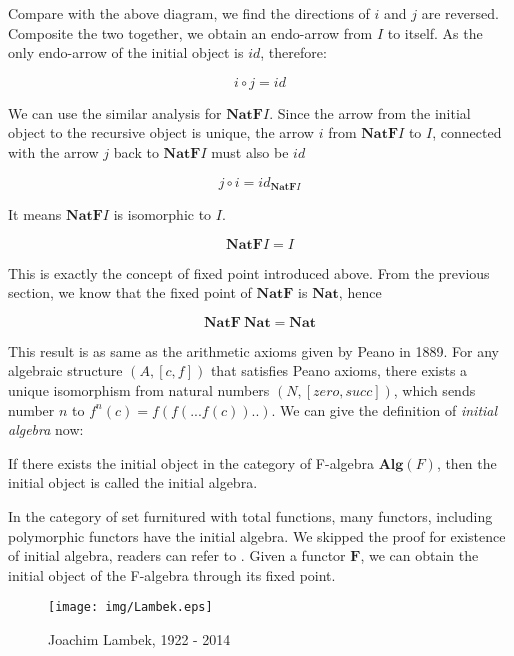 \documentclass{article}
\begin{document}
Compare with the above diagram, we find the directions of $i$ and $j$ are reversed. Composite the two together, we obtain an endo-arrow from $I$ to itself. As the only endo-arrow of the initial object is $id$, therefore:

\[
i \circ j = id
\]

We can use the similar analysis for $\mathbf{NatF}I$. Since the arrow from the initial object to the recursive object is unique, the arrow $i$ from $\mathbf{NatF}I$ to $I$, connected with the arrow $j$ back to $\mathbf{NatF}I$ must also be $id$

\[
j \circ i = id_{\mathbf{NatF}I}
\]

It means $\mathbf{NatF}I$ is isomorphic to $I$.

\[
  \mathbf{NatF} I = I
\]

This is exactly the concept of fixed point introduced above. From the previous section, we know that the fixed point of $\mathbf{NatF}$ is $\mathbf{Nat}$, hence

\[
  \mathbf{NatF}\ \mathbf{Nat} = \mathbf{Nat}
\]

This result is as same as the arithmetic axioms given by Peano in 1889. For any algebraic structure $(A, [c, f])$ that satisfies Peano axioms, there exists a unique isomorphism from natural numbers $(N, [zero, succ])$, which sends number $n$ to $f^n(c) = f(f(...f(c))..)$. We can give the definition of {\em initial algebra} now:

\begin{definition}
If there exists the initial object in the category of F-algebra $\pmb{Alg}(F)$, then the initial object is called the initial algebra.
\end{definition}

In the category of set furnitured with total functions, many functors, including polymorphic functors have the initial algebra. We skipped the proof for existence of initial algebra, readers can refer to \cite{Manes-Arbib-1986}. Given a functor $\mathbf{F}$, we can obtain the initial object of the F-algebra through its fixed point.

\begin{figure}[htbp]
 \centering
 \texttt{[image: img/Lambek.eps]}
 \captionsetup{labelformat=empty}
 \caption{Joachim Lambek, 1922 - 2014}
 \label{fig:Lambek}
\end{figure}
\end{document}
